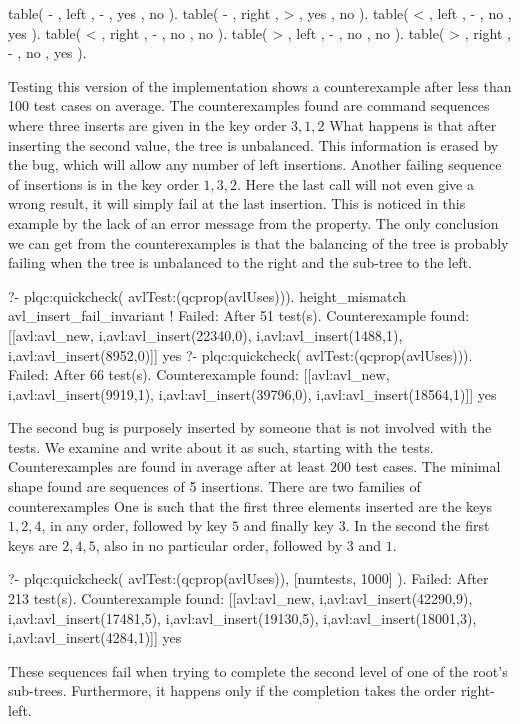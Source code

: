\begin{yapcode}
 table( -  , left   , -  , yes  , no   ).
 table( -  , right  , >  , yes  , no   ).
 table( <  , left   , -  , no   , yes  ).
 table( <  , right  , -  , no   , no   ).
 table( >  , left   , -  , no   , no   ).
 table( >  , right  , -  , no   , yes  ).
\end{yapcode}
%
%
Testing this version of the implementation shows a counterexample after
less than 100 test cases on average.
%
%
The counterexamples found are command sequences where three inserts are
given in the key order $3, 1, 2$
%
What happens is that after inserting the second value, the tree is
unbalanced.
%
This information is erased by the bug, which will allow any number of
left insertions.
%
Another failing sequence of insertions is in the key order $1, 3, 2$.
%
Here the last call will not even give a wrong result, it will simply
fail at the last insertion.
%
This is noticed in this example by the lack of an error message from the
property.
%
%
The only conclusion we can get from the counterexamples is that the
balancing of the tree is probably failing when the tree is unbalanced to
the right and the sub-tree to the left.
\begin{yapcode}
   ?- plqc:quickcheck(
             avlTest:(qcprop(avlUses))).
 height_mismatch
 avl_insert_fail_invariant
 !
 Failed: After 51 test(s).
 Counterexample found:
   [[avl:avl_new,
     {i,avl:avl_insert(22340,0)},
     {i,avl:avl_insert(1488,1)},
     {i,avl:avl_insert(8952,0)}]] 
 yes
   ?- plqc:quickcheck(
             avlTest:(qcprop(avlUses))).
 Failed: After 66 test(s).
 Counterexample found:
   [[avl:avl_new,
     {i,avl:avl_insert(9919,1)},
     {i,avl:avl_insert(39796,0)},
     {i,avl:avl_insert(18564,1)}]]
 yes
\end{yapcode}



The second bug is purposely inserted by someone that is not involved
with the tests.
%
We examine and write about it as such, starting with the tests.
%
Counterexamples are found in average after at least 200 test cases.
%
The minimal shape found are sequences of 5 insertions.
%
There are two families of counterexamples
%
One is such that the first three elements inserted are the keys $1, 2,
4$, in any order, followed by key $5$ and finally key $3$.
%
In the second the first keys are $2, 4, 5$, also in no particular order,
followed by $3$ and $1$.
%
\begin{yapcode}
   ?- plqc:quickcheck(
               avlTest:(qcprop(avlUses)),
               [{numtests, 1000}] ).
 Failed: After 213 test(s).
 Counterexample found:
   [[avl:avl_new,
     {i,avl:avl_insert(42290,9)},
     {i,avl:avl_insert(17481,5)},
     {i,avl:avl_insert(19130,5)},
     {i,avl:avl_insert(18001,3)},
     {i,avl:avl_insert(4284,1)}]]
 yes
\end{yapcode}
%
These sequences fail when trying to complete the second level of one of
the root's sub-trees.
%
Furthermore, it happens only if the completion takes the order
right-left.


